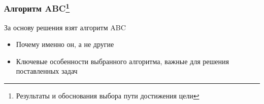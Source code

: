 \documentclass
  [ russian
  , aspectratio=1610 %
  ] {beamer}
\begin{document}

\begin{frame}
    \frametitle{Алгоритм ABC\footnote{Результаты и обоснования выбора пути достижения цели}}
    За основу решения взят алгоритм ABC
    \begin{itemize}
        \item Почему именно он, а не другие
        \item Ключевые особенности выбранного алгоритма, важные для решения поставленных задач
    \end{itemize}
\end{frame}

\end{document}
